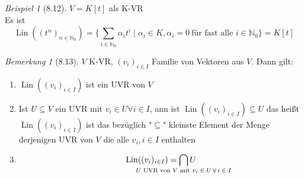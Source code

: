 \documentclass[a4paper]{scrartcl}
\DeclareMathOperator{\Forall}{\forall}
\DeclareMathOperator{\Lin}{Lin}
\theoremstyle{definition}
\theoremstyle{plain}
\theoremstyle{plain}
\theoremstyle{remark}
\newtheorem{remark}{Bemerkung}
\theoremstyle{remark}
\theoremstyle{remark}
\newtheorem{ex}{Beispiel}
\begin{document}
\begin{ex}[8.12]
$V = K[t]$ als K-VR \\
  Es ist \[\Lin((t^n)_{n\in\mathbb{N}_0}) = \{\sum_{i\in\mathbb{N}_0} \alpha_i t^i \mid \alpha_i \in K, \alpha_i = 0~\text{für fast alle $i\in \mathbb{N}_0$}\} = K[t]\]
\end{ex}
\begin{remark}[8.13]
$V$ K-VR, $(v_i)_{i\in I}$ Familie von Vektoren aus $V$. Dann gilt:
\begin{enumerate}
\item $\Lin((v_i)_{i\in I})$ ist ein UVR von $V$
\item Ist $U\subseteq V$ ein UVR mit $v_i \in U\Forall i\in I$, ann ist $\Lin((v_i)_{i\in I}) \subseteq U$
     das heißt $\Lin((v_i)_{i\in I})$ ist das bezüglich "$\subseteq$" kleinste Element der Menge derjenigen UVR von $V$ die alle $v_i, i\in I$ enthalten
\item \[\Lin((v_i)_{i\in I}) = \bigcap_{\mathclap{\text{$U$ UVR von $V$ mit $v_i \in U \Forall i\in I$}}} U\]
\end{enumerate}
\end{remark}
\end{document}
